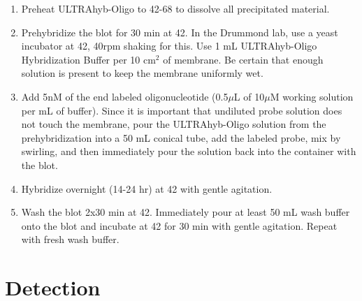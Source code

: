 \documentclass{article}
\newcommand{\mul}{\ensuremath{\mu}L\xspace}
\newcommand{\muM}{\ensuremath{\mu}M\xspace}
\newcommand{\degC}{\celsius\xspace}
\begin{document}
\begin{enumerate}[resume]
\item Preheat ULTRAhyb-Oligo to 42-68\degC to dissolve all precipitated material.
\item Prehybridize the blot for 30 min at 42\degC. In the Drummond lab, use a yeast incubator at 42\degC, 40rpm shaking for this.
Use 1 mL ULTRAhyb-Oligo Hybridization Buffer per 10 cm$^2$ of membrane. Be certain that enough solution is present to keep the membrane uniformly wet.
\item Add 5nM of the end labeled oligonucleotide (0.5\mul of 10\muM working solution per mL of buffer). 
Since it is important that undiluted probe solution does not touch the membrane, pour the ULTRAhyb-Oligo solution from the prehybridization into a 50 mL conical tube, add the labeled probe, mix by swirling, and then immediately pour the solution back into the container with the blot.
\item Hybridize overnight (14-24 hr) at 42\degC with gentle agitation.
\item Wash the blot 2x30 min at 42\degC. Immediately pour at least 50 mL wash buffer onto the blot and incubate at 42\degC for 30 min with gentle agitation. Repeat with fresh wash buffer.
\end{enumerate}

\section*{Detection}
\label{sec:detect}

\end{document}

